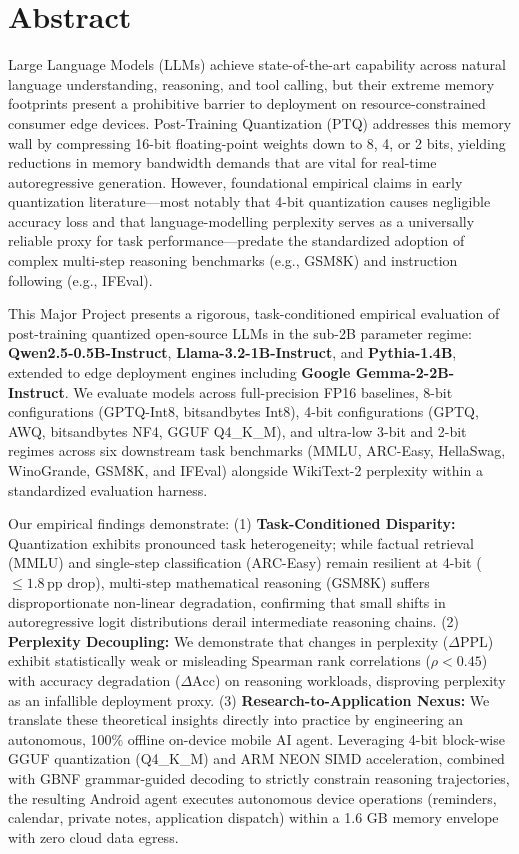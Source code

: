 \documentclass[12pt,a4paper,oneside]{report}
\begin{document}
\chapter*{Abstract}

Large Language Models (LLMs) achieve state-of-the-art capability across natural language understanding, reasoning, and tool calling, but their extreme memory footprints present a prohibitive barrier to deployment on resource-constrained consumer edge devices. Post-Training Quantization (PTQ) addresses this memory wall by compressing 16-bit floating-point weights down to 8, 4, or 2 bits, yielding reductions in memory bandwidth demands that are vital for real-time autoregressive generation. However, foundational empirical claims in early quantization literature—most notably that 4-bit quantization causes negligible accuracy loss and that language-modelling perplexity serves as a universally reliable proxy for task performance—predate the standardized adoption of complex multi-step reasoning benchmarks (e.g., GSM8K) and instruction following (e.g., IFEval).

This Major Project presents a rigorous, task-conditioned empirical evaluation of post-training quantized open-source LLMs in the sub-2B parameter regime: \textbf{Qwen2.5-0.5B-Instruct}, \textbf{Llama-3.2-1B-Instruct}, and \textbf{Pythia-1.4B}, extended to edge deployment engines including \textbf{Google Gemma-2-2B-Instruct}. We evaluate models across full-precision FP16 baselines, 8-bit configurations (GPTQ-Int8, bitsandbytes Int8), 4-bit configurations (GPTQ, AWQ, bitsandbytes NF4, GGUF Q4\_K\_M), and ultra-low 3-bit and 2-bit regimes across six downstream task benchmarks (MMLU, ARC-Easy, HellaSwag, WinoGrande, GSM8K, and IFEval) alongside WikiText-2 perplexity within a standardized evaluation harness.

Our empirical findings demonstrate: (1) \textbf{Task-Conditioned Disparity:} Quantization exhibits pronounced task heterogeneity; while factual retrieval (MMLU) and single-step classification (ARC-Easy) remain resilient at 4-bit ($\le 1.8\,\text{pp}$ drop), multi-step mathematical reasoning (GSM8K) suffers disproportionate non-linear degradation, confirming that small shifts in autoregressive logit distributions derail intermediate reasoning chains. (2) \textbf{Perplexity Decoupling:} We demonstrate that changes in perplexity ($\Delta\text{PPL}$) exhibit statistically weak or misleading Spearman rank correlations ($\rho < 0.45$) with accuracy degradation ($\Delta\text{Acc}$) on reasoning workloads, disproving perplexity as an infallible deployment proxy. (3) \textbf{Research-to-Application Nexus:} We translate these theoretical insights directly into practice by engineering an autonomous, 100\% offline on-device mobile AI agent. Leveraging 4-bit block-wise GGUF quantization (Q4\_K\_M) and ARM NEON SIMD acceleration, combined with GBNF grammar-guided decoding to strictly constrain reasoning trajectories, the resulting Android agent executes autonomous device operations (reminders, calendar, private notes, application dispatch) within a 1.6 GB memory envelope with zero cloud data egress.
\end{document}

